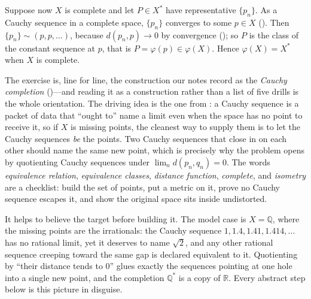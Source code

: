 \documentclass[main.tex]{subfiles}
\begin{document}
\begin{SolutionBlue}
Suppose now $X$ is complete and let $P\in X^*$ have representative $\{p_n\}$. As a Cauchy sequence in a
complete space, $\{p_n\}$ converges to some $p\in X$ (). Then $\{p_n\}\sim(p,p,\dots)$, because $d(p_n,p)\to 0$ by convergence
(); so $P$ is the class of the constant sequence at $p$, that is $P=\varphi(p)\in\varphi(X)$.
Hence $\varphi(X)=X^*$ when $X$ is complete.
\end{SolutionBlue}

\begin{Reflection}
The exercise is, line for line, the construction our notes record as the \emph{Cauchy completion}
()---and reading it as a construction rather than a list of five drills is the whole
orientation. The driving idea is the one from : a Cauchy sequence is a packet of data that
``ought to'' name a limit even when the space has no point to receive it, so if $X$ is missing points,
the cleanest way to supply them is to let the Cauchy sequences \emph{be} the points. Two Cauchy
sequences that close in on each other should name the same new point, which is precisely why the
problem opens by quotienting Cauchy sequences under $\lim_n d(p_n,q_n)=0$. The words \emph{equivalence
relation}, \emph{equivalence classes}, \emph{distance function}, \emph{complete}, and \emph{isometry}
are a checklist: build the set of points, put a metric on it, prove no Cauchy sequence escapes it, and
show the original space sits inside undistorted.

It helps to believe the target before building it. The model case is $X=\mathbb Q$, where the missing
points are the irrationals: the Cauchy sequence $1,1.4,1.41,1.414,\dots$ has no rational limit, yet it
deserves to name $\sqrt2$, and any other rational sequence creeping toward the same gap is declared
equivalent to it. Quotienting by ``their distance tends to $0$'' glues exactly the sequences pointing
at one hole into a single new point, and the completion $\mathbb Q^*$ is a copy of $\mathbb R$. Every
abstract step below is this picture in disguise.


\end{Reflection}
\end{document}
